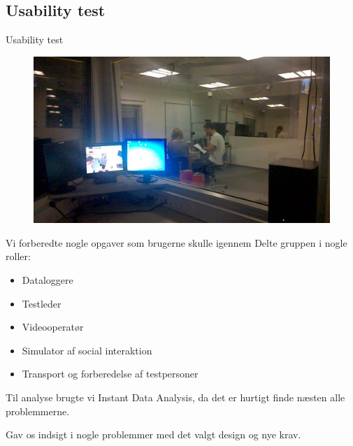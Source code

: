 \subsection{Usability test}
\begin{frame}{Usability test}
	\begin{figure}
		\centering
		\includegraphics[width=\textwidth/2]{slides/Heider/subjectRoom}
	\end{figure}
	Vi forberedte nogle opgaver som brugerne skulle igennem
	Delte gruppen i nogle roller:
	\begin{itemize}
		\item Dataloggere
		\item Testleder
		\item Videooperatør
		\item Simulator af social interaktion
		\item Transport og forberedelse af testpersoner
	\end{itemize}
	Til analyse brugte vi Instant Data Analysis, da det er hurtigt finde næsten alle problemmerne.

	Gav os indsigt i nogle problemmer med det valgt design og nye krav.
\end{frame}
